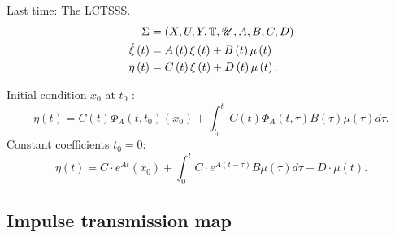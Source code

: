 Last time: The LCTSSS.
\begin{align*}
        \Sigma &= \left( X, U, Y, \mathbb{T} , \mathscr{U}, A, B , C, D \right) \\
                \dot{\xi}\left( t \right) &=  A\left( t \right) \xi\left(     t \right)  + B\left( t \right) \mu\left( t \right)  \\
		\eta\left( t \right) &= C\left( t \right) \xi\left( t \right)  + D\left( t \right) \mu\left( t \right) 
.\end{align*}

Initial condition $x_0$ at $t_0$ : 
\[
	\eta\left( t \right) = C\left( t \right) \Phi_A \left( t, t_0 \right)  \left( x_0 \right) + \int_{t_0}^{t} C\left( t \right) \Phi _A \left( t, \tau \right) B\left( \tau \right) \mu\left( \tau \right) d \tau
.\] 
Constant coefficients $t_0 = 0$: 
\[
	\eta\left( t \right) = C\cdot e^{At}\left( x_0 \right) + \int_{0}^{t} C \cdot  e^{A\left( t - \tau \right) } B \mu\left( \tau  \right) d \tau + D\cdot \mu\left( t \right) 
.\] 
\subsection{Impulse transmission map}

